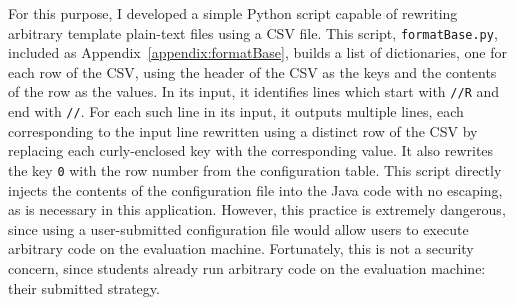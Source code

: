 \documentclass[pageno]{jpaper}
\begin{document}
For this purpose, I developed a simple Python script capable of rewriting arbitrary template plain-text files using a CSV file.
This script, \texttt{formatBase.py}, included as Appendix~\ref{appendix:formatBase}, builds a list of dictionaries, one for each row of the CSV, using the header of the CSV as the keys and the contents of the row as the values.
In its input, it identifies lines which start with \texttt{//R} and end with \texttt{//}.
For each such line in its input, it outputs multiple lines, each corresponding to the input line rewritten using a distinct row of the CSV by replacing each curly-enclosed key with the corresponding value.
It also rewrites the key \texttt{0} with the row number from the configuration table.
This script directly injects the contents of the configuration file into the Java code with no escaping, as is necessary in this application.
However, this practice is extremely dangerous, since using a user-submitted configuration file would allow users to execute arbitrary code on the evaluation machine.
Fortunately, this is not a security concern, since students already run arbitrary code on the evaluation machine: their submitted strategy.
\end{document}

